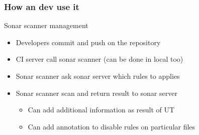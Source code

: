 \subsubsection{How an dev use it}
\begin{frame}[fragile]{\subsubsecname}
  Sonar scanner management
  \begin{itemize}
    \item Developers commit and push on the repository
    \item CI server call sonar scanner (can be done in local too)
    \item Sonar scanner ask sonar server which rules to applies
    \item Sonar scanner scan and return result to sonar server
    \begin{itemize}
      \item Can add additional information as result of UT
      \item Can add annotation to disable rules on particular files
    \end{itemize}
  \end{itemize}
\end{frame}
